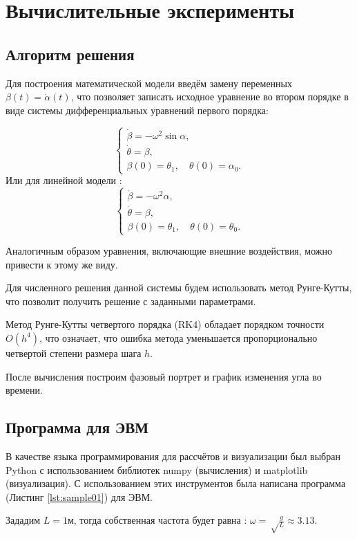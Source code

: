 \chapter{Вычислительные эксперименты}
\section{Алгоритм решения}
Для построения математической модели введём замену переменных $\beta(t) = \dot{\alpha}(t)$, что позволяет записать исходное уравнение во втором порядке в виде системы дифференциальных уравнений первого порядка:

\[
\begin{cases}
	\dot{\beta} = -\omega^2 \sin \alpha, \\
	\dot{\theta} = \beta, \\
	\beta(0) = \theta_1, \quad \theta(0) = \alpha_0.
\end{cases}
\]
Или для линейной модели :
\[
\begin{cases}
	\dot{\beta} = -\omega^2 \alpha, \\
	\dot{\theta} = \beta, \\
	\beta(0) = \theta_1, \quad \theta(0) = \theta_0.
\end{cases}
\]

Аналогичным образом уравнения, включающие внешние воздействия, можно привести к этому же виду.

Для численного решения данной системы будем использовать метод Рунге-Кутты\cite{1964calculus}, что позволит получить решение с заданными параметрами. 

Метод Рунге-Кутты четвертого порядка (RK4) обладает порядком точности \( O(h^4) \), что означает, что ошибка метода уменьшается пропорционально четвертой степени размера шага \( h \). 

После вычисления построим фазовый портрет и график изменения угла во времени.

\section{Программа для ЭВМ}
В качестве языка программирования для рассчётов и визуализации был выбран Python с использованием библиотек numpy (вычисления) и matplotlib (визуализация).
С использованием этих инструментов была написана программа (Листинг \ref{lst:sample01}) для ЭВМ.
 

Зададим $L = 1\text{м}$, тогда собственная частота будет равна : $\omega = \sqrt\frac{g}{L} \approx 3.13$.
